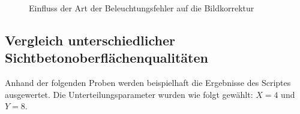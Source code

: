 \documentclass{article}
\begin{document}
\begin{figure}[htbp]
{		\label{pic:example2a}
	}
	\caption{Einfluss der Art der Beleuchtungsfehler auf die Bildkorrektur}
\end{figure}

\subsection{Vergleich unterschiedlicher Sichtbetonoberflächenqualitäten}

Anhand der folgenden Proben werden beispielhaft die Ergebnisse des Scriptes ausgewertet. Die Unterteilungsparameter wurden wie folgt gewählt: $X = 4$ und $Y = 8$. 
\end{document}
